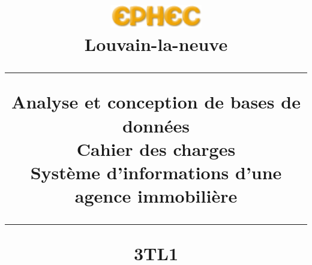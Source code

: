 \title{
\parbox{15cm}
{\includegraphics[width=4cm]{ephec.png} \\ 
  Louvain-la-neuve\\
  \vspace{3cm}
	\begin{center}\sf\bfseries\Huge
		\rule{15cm}{1pt}
		\medskip
		Analyse et conception de bases de données\\
		\huge Cahier des charges\\
		\vspace{.5cm}
		\Large Système d'informations d'une agence immobilière
		\vspace{.5cm}
		\rule{15cm}{1pt}
		\large 3TL1
	\end{center}
	\vspace{3cm}
}} 